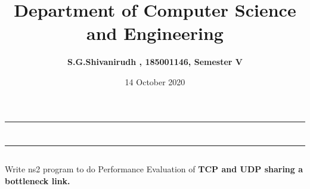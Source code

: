 \documentclass[12pt,letterpaper]{article}
\title{\textbf{Department of Computer Science and Engineering}}
\author{\textbf{S.G.Shivanirudh , 185001146, Semester V }}
\date{14 October 2020}
\begin{document}
\maketitle
\hrule
\section*{}
\hrule 
\bigskip\bigskip

\subsection*{}

\subsection*{}
\begin{flushleft}
Write ns2 program to do Performance Evaluation of \textbf{TCP and UDP sharing a bottleneck link.}
\end{flushleft}

\end{document}
